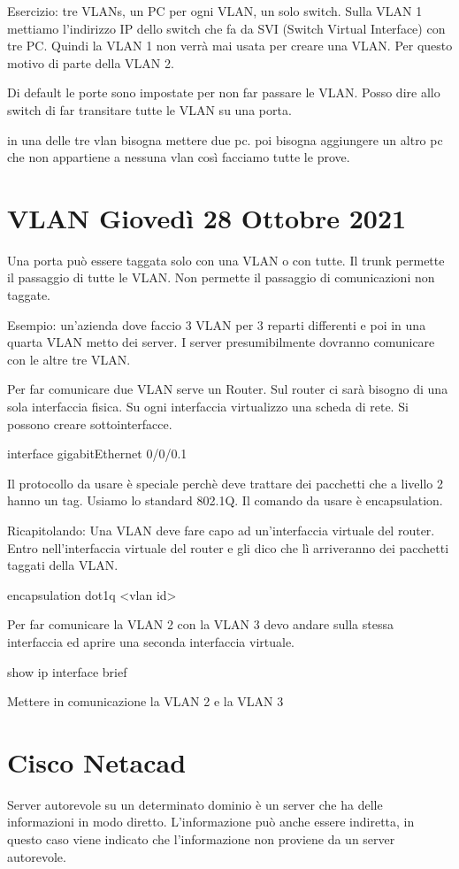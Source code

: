 \documentclass{article}
\begin{document}
    Esercizio: tre VLANs, un PC per ogni VLAN, un solo switch. Sulla VLAN 1 mettiamo l'indirizzo IP dello switch che fa da SVI (Switch Virtual Interface) con tre PC. Quindi la VLAN 1 non verrà mai usata per creare una VLAN. Per questo motivo di parte della VLAN 2.

    Di default le porte sono impostate per non far passare le VLAN. Posso dire allo switch di far transitare tutte le VLAN su una porta.

    in una delle tre vlan bisogna mettere due pc. poi bisogna aggiungere un altro pc che non appartiene a nessuna vlan così facciamo tutte le prove. 

    \section{VLAN Giovedì 28 Ottobre 2021}

    Una porta può essere taggata solo con una VLAN o con tutte.
    Il trunk permette il passaggio di tutte le VLAN. Non permette il passaggio di comunicazioni non taggate.

    Esempio: un'azienda dove faccio 3 VLAN per 3 reparti differenti e poi in una quarta VLAN metto dei server. I server presumibilmente dovranno comunicare con le altre tre VLAN.

    Per far comunicare due VLAN serve un Router. Sul router ci sarà bisogno di una sola interfaccia fisica.
    Su ogni interfaccia virtualizzo una scheda di rete.
    Si possono creare sottointerfacce.

    interface gigabitEthernet 0/0/0.1

    Il protocollo da usare è speciale perchè deve trattare dei pacchetti che a livello 2 hanno un tag.
    Usiamo lo standard 802.1Q. Il comando da usare è encapsulation.

    Ricapitolando:
    Una VLAN deve fare capo ad un'interfaccia virtuale del router.
    Entro nell'interfaccia virtuale del router e gli dico che lì arriveranno dei pacchetti taggati della VLAN.

    encapsulation dot1q <vlan id>

    Per far comunicare la VLAN 2 con la VLAN 3 devo andare sulla stessa interfaccia ed aprire una seconda interfaccia virtuale.

    show ip interface brief

    Mettere in comunicazione la VLAN 2 e la VLAN 3

    \section{Cisco Netacad}
    Server autorevole su un determinato dominio è un server che ha delle informazioni in modo diretto. 
    L'informazione può anche essere indiretta, in questo caso viene indicato che l'informazione non proviene da un server autorevole.
\end{document}
